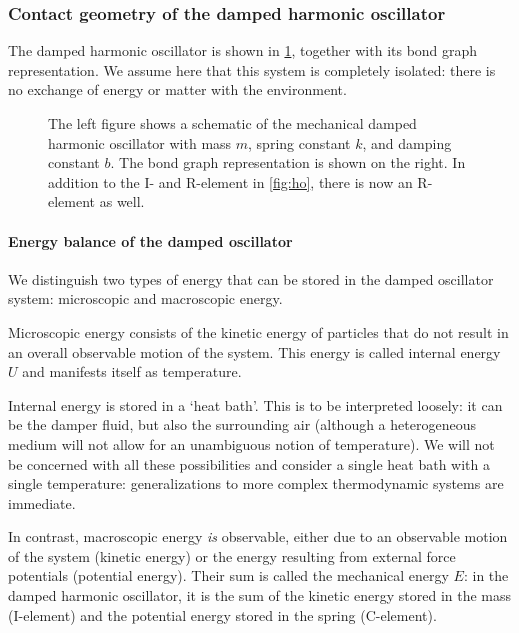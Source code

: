 \subsubsection{Contact geometry of the damped harmonic oscillator}
The damped harmonic oscillator is shown in \cref{fig:dho}, together with its bond graph representation. We assume here that this system is completely isolated: there is no exchange of energy or matter with the environment.  
\begin{figure}[ht!]
    \centering
    
    \caption{The left figure shows a schematic of the mechanical damped harmonic oscillator with mass \(m\), spring constant \(k\), and damping constant \(b\). The bond graph representation is shown on the right. In addition to the I- and R-element in \cref{fig:ho}, there is now an R-element as well.}
    \label{fig:dho}
\end{figure}

\paragraph{Energy balance of the damped oscillator} We distinguish two types of energy that can be stored in the damped oscillator system: microscopic and macroscopic energy.

Microscopic energy consists of the kinetic energy of particles that do not result in an overall observable motion of the system. This energy is called internal energy \(U\) and manifests itself as temperature. 

Internal energy is stored in a `heat bath'. This is to be interpreted loosely: it can be the damper fluid, but also the surrounding air (although a heterogeneous medium will not allow for an unambiguous notion of temperature). We will not be concerned with all these possibilities and consider a single heat bath with a single temperature: generalizations to more complex thermodynamic systems are immediate. 

In contrast, macroscopic energy \emph{is} observable, either due to an observable motion of the system (kinetic energy) or the energy resulting from external force potentials (potential energy). Their sum is called the mechanical energy \(E\): in the damped harmonic oscillator, it is the sum of the kinetic energy stored in the mass (I-element) and the potential energy stored in the spring (C-element).

